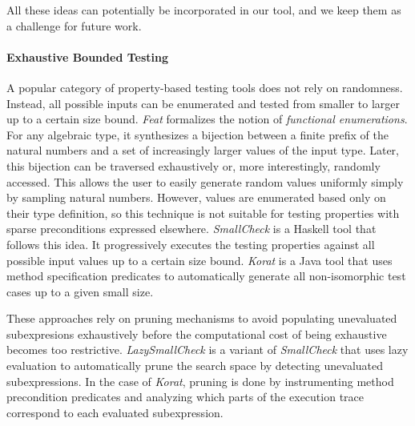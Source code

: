 \documentclass[sigconf,review,anonymous]{acmart}
\begin{document}
%
All these ideas can potentially be incorporated in our tool, and we keep them as
a challenge for future work.


\paragraph{Exhaustive Bounded Testing}

A popular category of property-based testing tools does not rely on randomness.
%
Instead, all possible inputs can be enumerated and tested from smaller to larger
up to a certain size bound.
%
%
%
\emph{Feat} \cite{DuregardJW12} formalizes the notion of \emph{functional
  enumerations}.
%
For any algebraic type, it synthesizes a bijection between a finite prefix of
the natural numbers and a set of increasingly larger values of the input type.
%
Later, this bijection can be traversed exhaustively or, more interestingly,
randomly accessed.
%
This allows the user to easily generate random values uniformly simply by
sampling natural numbers.
%
However, values are enumerated based only on their type definition, so this
technique is not suitable for testing properties with sparse preconditions
expressed elsewhere.
%
\emph{SmallCheck} \cite{runciman2008smallcheck} is a Haskell tool that follows
this idea.
%
It progressively executes the testing properties against all possible input
values up to a certain size bound.
%
\emph{Korat} \cite{boyapati2002korat} is a Java tool that uses method
specification predicates to automatically generate all non-isomorphic test cases
up to a given small size.


These approaches rely on pruning mechanisms to avoid populating unevaluated
subexpresions exhaustively before the computational cost of being exhaustive
becomes too restrictive.
%
\emph{LazySmallCheck} is a variant of \emph{SmallCheck} that uses lazy
evaluation to automatically prune the search space by detecting unevaluated
subexpressions.
%
In the case of \emph{Korat}, pruning is done by instrumenting method
precondition predicates and analyzing which parts of the execution trace
correspond to each evaluated subexpression.
\end{document}

